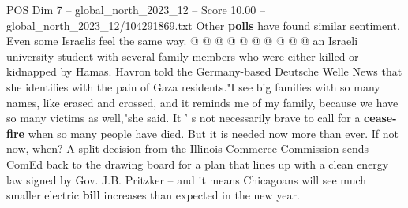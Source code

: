 \begin{textsample}{POS Dim 7 – global\_north\_2023\_12 – Score 10.00 – global\_north\_2023\_12/104291869.txt}
Other \textbf{polls} have found similar sentiment.
Even some Israelis feel the same way. @ @ @ @ @ @ @ @ @ @ an Israeli university student with several family members who were either killed or kidnapped by Hamas.
Havron told the Germany-based Deutsche Welle News that she identifies with the pain of Gaza residents."I see big families with so many names, like erased and crossed, and it reminds me of my family, because we have so many victims as well,"she said.
It ' s not necessarily brave to call for a \textbf{cease-fire} when so many people have died.
But it is needed now more than ever.
If not now, when?
A split decision from the Illinois Commerce Commission sends ComEd back to the drawing board for a plan that lines up with a clean energy law signed by Gov.
J.B.
Pritzker -- and it means Chicagoans will see much smaller electric \textbf{bill} increases than expected in the new year.

\end{textsample}
